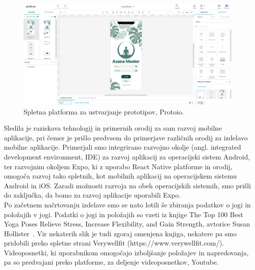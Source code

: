 \documentclass[a4paper, 12pt]{book}
\begin{document}
\begin{figure}[htbp]
\begin{center}
\includegraphics[scale=.23]{protoio.jpg}
\end{center}
\caption{Spletna platforma za ustvarjanje prototipov, Protoio.}
\label{protoio}
\end{figure}

Sledila je raziskava tehnologij in primernih orodij za sam razvoj mobilne aplikacije, pri čemer je prišlo predvsem do primerjave različnih orodij za izdelavo mobilne aplikacije. Primerjali smo integrirano razvojno okolje (angl. integrated development environment, IDE) za razvoj aplikacij za operacijski sistem Android, ter razvojnim okoljem Expo, ki z uporabo React Native platforme in orodij, omogoča razvoj tako spletnih, kot mobilnih aplikacij na operacijskem sistemu Android in iOS. Zaradi možnosti razvoja na obeh operacijskih sistemih, smo prišli do zaključka, da bomo za razvoj aplikacije uporabili Expo.\\

Po začetnem načrtovanju izdelave smo se nato lotili še zbiranja podatkov o jogi in položajih v jogi. Podatki o jogi in položajih so vzeti iz knjige The Top 100 Best Yoga Poses Relieve Stress, Increase Flexibility, and Gain Strength, avtorice Susan Hollister~\cite{yoga}. Vir nekaterih slik je tudi zgoraj omenjena knjiga, nekatere pa smo pridobili preko spletne strani Verywellfit (https://www.verywellfit.com/). Videoposnetki, ki uporabnikom omogočajo izboljšanje položajev in napredovanja, pa so predvajani preko platforme, za deljenje videoposnetkov, Youtube.
\end{document}
